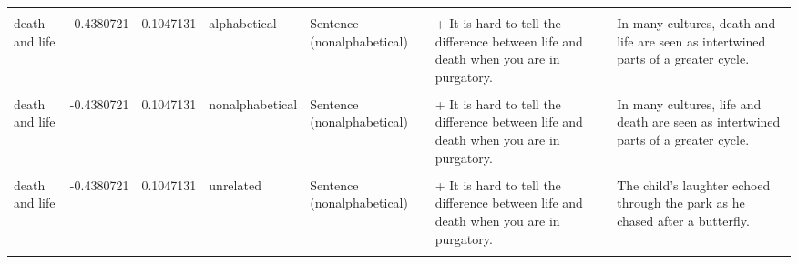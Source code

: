 \documentclass[
  12pt,
]{scrartcl}
\begin{document}
\begin{landscape}
\begin{longtable}{lrrllll}
\cellcolor{gray!6}{death and life} & \cellcolor{gray!6}{-0.4380721} & \cellcolor{gray!6}{0.1047131} & \cellcolor{gray!6}{alphabetical} & \cellcolor{gray!6}{Sentence (alphabetical)} & \cellcolor{gray!6}{+ It is hard to tell the difference between death and life when you are in purgatory.} & \cellcolor{gray!6}{In many cultures, death and life are seen as intertwined parts of a greater cycle.}\\
death and life & -0.4380721 & 0.1047131 & alphabetical & Sentence (nonalphabetical) & + It is hard to tell the difference between life and death when you are in purgatory. & In many cultures, death and life are seen as intertwined parts of a greater cycle.\\
\cellcolor{gray!6}{death and life} & \cellcolor{gray!6}{-0.4380721} & \cellcolor{gray!6}{0.1047131} & \cellcolor{gray!6}{nonalphabetical} & \cellcolor{gray!6}{Sentence (alphabetical)} & \cellcolor{gray!6}{+ It is hard to tell the difference between death and life when you are in purgatory.} & \cellcolor{gray!6}{In many cultures, life and death are seen as intertwined parts of a greater cycle.}\\
death and life & -0.4380721 & 0.1047131 & nonalphabetical & Sentence (nonalphabetical) & + It is hard to tell the difference between life and death when you are in purgatory. & In many cultures, life and death are seen as intertwined parts of a greater cycle.\\
\addlinespace
\cellcolor{gray!6}{death and life} & \cellcolor{gray!6}{-0.4380721} & \cellcolor{gray!6}{0.1047131} & \cellcolor{gray!6}{unrelated} & \cellcolor{gray!6}{Sentence (alphabetical)} & \cellcolor{gray!6}{+ It is hard to tell the difference between death and life when you are in purgatory.} & \cellcolor{gray!6}{The child’s laughter echoed through the park as he chased after a butterfly.}\\
death and life & -0.4380721 & 0.1047131 & unrelated & Sentence (nonalphabetical) & + It is hard to tell the difference between life and death when you are in purgatory. & The child’s laughter echoed through the park as he chased after a butterfly.\\
\cellcolor{gray!6}{boys and girls} & \cellcolor{gray!6}{0.3825196} & \cellcolor{gray!6}{0.6258780} & \cellcolor{gray!6}{alphabetical} & \cellcolor{gray!6}{Sentence (alphabetical)} & \cellcolor{gray!6}{+ The teacher separated the boys and girls into two small groups.} & \cellcolor{gray!6}{Boys and girls eagerly gathered around the storyteller for an afternoon of tales.}\\

\end{longtable}
\end{landscape}
\end{document}
